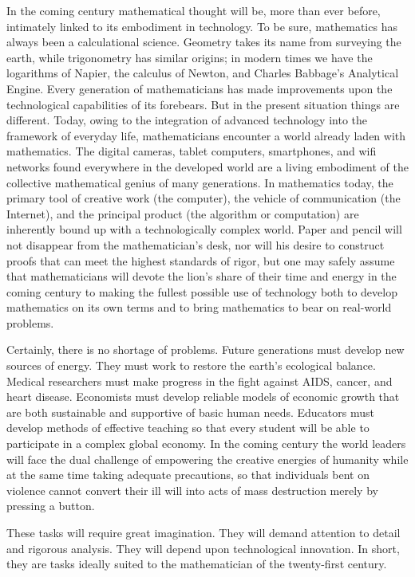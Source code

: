      In the coming century mathematical thought will be, more than ever before, intimately linked to its embodiment in technology.  To be sure, mathematics has always been a calculational science. Geometry takes its name from surveying the earth, while trigonometry has similar origins; in modern times we have the logarithms of Napier, the calculus of Newton, and Charles Babbage's Analytical Engine.  Every generation of mathematicians has made improvements upon the technological capabilities of its forebears.  But in the present situation things are different.  Today, owing to the integration of advanced technology into the framework of everyday life, mathematicians encounter a world already laden with mathematics.  The digital cameras, tablet computers, smartphones, and wifi networks found everywhere in the developed world are a living embodiment of the collective mathematical genius of many generations.  In mathematics today, the primary tool of creative work (the computer), the vehicle of communication (the Internet), and the principal product (the algorithm or computation) are inherently bound up with a technologically complex world.  Paper and pencil will not disappear from the mathematician's desk, nor will his desire to construct proofs that can meet the highest standards of rigor, but one may safely assume that mathematicians will devote the lion's share of their time and energy in the coming century to making the fullest possible use of technology both to develop mathematics on its own terms and to bring mathematics to bear on real-world problems.
       
Certainly, there is no shortage of problems.  Future generations must develop new sources of energy.  They must work to restore the earth's ecological balance.  Medical researchers must make progress in the fight against AIDS, cancer, and heart disease.  Economists must develop reliable models of economic growth that are both sustainable and supportive of basic human needs.  Educators must develop methods of effective teaching so that every student will be able to participate in a complex global economy.  In the coming century the world leaders will face the dual challenge of empowering the creative energies of humanity while at the same time taking adequate precautions, so that individuals bent on violence cannot convert their ill will into acts of mass destruction merely by pressing a button.
  
These tasks will require great imagination.  They will demand attention to detail and rigorous analysis.  They will depend upon technological innovation.  In short, they are tasks ideally suited to the mathematician of the twenty-first century.  
